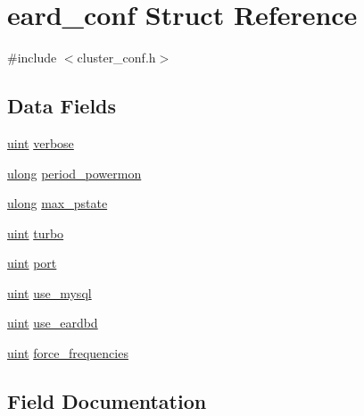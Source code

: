 \hypertarget{structeard__conf}{}\section{eard\+\_\+conf Struct Reference}
\label{structeard__conf}


{\ttfamily \#include $<$cluster\+\_\+conf.\+h$>$}

\subsection*{Data Fields}
\begin{DoxyCompactItemize}
\item 
\hyperlink{generic_8h_a91ad9478d81a7aaf2593e8d9c3d06a14}{uint} \hyperlink{structeard__conf_ad44edb707601cc0fcdc4e84fc2fed141}{verbose}
\item 
\hyperlink{generic_8h_a718b4eb2652c286f4d42dc18a8e71a1a}{ulong} \hyperlink{structeard__conf_af564a657ecf9184893366b0967815e9d}{period\+\_\+powermon}
\item 
\hyperlink{generic_8h_a718b4eb2652c286f4d42dc18a8e71a1a}{ulong} \hyperlink{structeard__conf_a2bb345d1606e383f384e357005c93d73}{max\+\_\+pstate}
\item 
\hyperlink{generic_8h_a91ad9478d81a7aaf2593e8d9c3d06a14}{uint} \hyperlink{structeard__conf_af7910835a434ce6e15eb7c0f90b4f249}{turbo}
\item 
\hyperlink{generic_8h_a91ad9478d81a7aaf2593e8d9c3d06a14}{uint} \hyperlink{structeard__conf_ae9970648297f7a87ef0e74a61a0ce076}{port}
\item 
\hyperlink{generic_8h_a91ad9478d81a7aaf2593e8d9c3d06a14}{uint} \hyperlink{structeard__conf_aaf118ac3a724e092f0852499361a66b0}{use\+\_\+mysql}
\item 
\hyperlink{generic_8h_a91ad9478d81a7aaf2593e8d9c3d06a14}{uint} \hyperlink{structeard__conf_a0fd3d0100036d16c34e38bbd7f7dd8c9}{use\+\_\+eardbd}
\item 
\hyperlink{generic_8h_a91ad9478d81a7aaf2593e8d9c3d06a14}{uint} \hyperlink{structeard__conf_a72a8269c5c85c2a0544ce949d1867ed5}{force\+\_\+frequencies}
\end{DoxyCompactItemize}


\subsection{Field Documentation}
